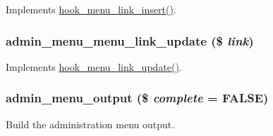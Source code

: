 \label{admin__menu_8module_aa2fdb44794becd942d82791196fb3175}
Implements \hyperlink{group__hooks_ga834a576b88ca7a08ce1244469fabb116}{hook\_\-menu\_\-link\_\-insert()}. \hypertarget{admin__menu_8module_adde167e89dea1bccbf8f74d0dd9844a6}{
\subsubsection[{admin\_\-menu\_\-menu\_\-link\_\-update}]{\setlength{\rightskip}{0pt plus 5cm}admin\_\-menu\_\-menu\_\-link\_\-update (\$ {\em link})}}
\label{admin__menu_8module_adde167e89dea1bccbf8f74d0dd9844a6}
Implements \hyperlink{group__hooks_gafd2d5cc2a49cf37a637201eb76a41d1d}{hook\_\-menu\_\-link\_\-update()}. \hypertarget{admin__menu_8module_a14e66c78d1c76de0b5265d4bdc111cb3}{
\subsubsection[{admin\_\-menu\_\-output}]{\setlength{\rightskip}{0pt plus 5cm}admin\_\-menu\_\-output (\$ {\em complete} = {\ttfamily FALSE})}}
\label{admin__menu_8module_a14e66c78d1c76de0b5265d4bdc111cb3}
Build the administration menu output.


